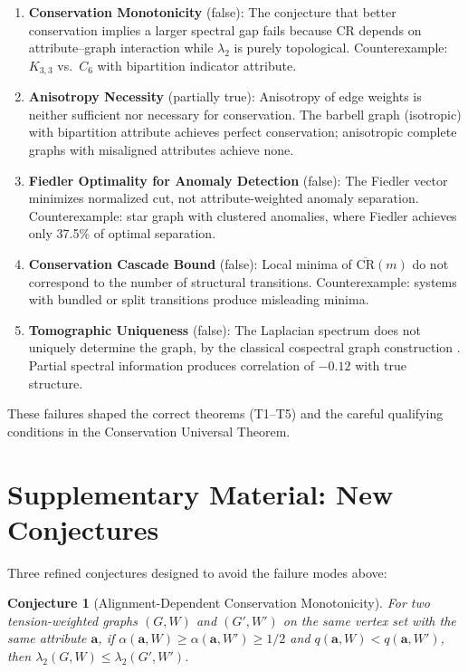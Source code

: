 \documentclass[12pt,letterpaper]{article}
\newtheorem{conjecture}[theorem]{Conjecture}
\newcommand{\bfa}{\mathbf{a}}
\newcommand{\CR}{\mathrm{CR}}
\begin{document}
\begin{enumerate}
  \item \textbf{Conservation Monotonicity} (false): The conjecture that better conservation implies a larger spectral gap fails because $\CR$ depends on attribute--graph interaction while $\lambda_2$ is purely topological. Counterexample: $K_{3,3}$ vs.\ $C_6$ with bipartition indicator attribute.

  \item \textbf{Anisotropy Necessity} (partially true): Anisotropy of edge weights is neither sufficient nor necessary for conservation. The barbell graph (isotropic) with bipartition attribute achieves perfect conservation; anisotropic complete graphs with misaligned attributes achieve none.

  \item \textbf{Fiedler Optimality for Anomaly Detection} (false): The Fiedler vector minimizes normalized cut, not attribute-weighted anomaly separation. Counterexample: star graph with clustered anomalies, where Fiedler achieves only 37.5\% of optimal separation.

  \item \textbf{Conservation Cascade Bound} (false): Local minima of $\overline{\CR}(m)$ do not correspond to the number of structural transitions. Counterexample: systems with bundled or split transitions produce misleading minima.

  \item \textbf{Tomographic Uniqueness} (false): The Laplacian spectrum does not uniquely determine the graph, by the classical cospectral graph construction \citep{collatz1957,vandam2003}. Partial spectral information produces correlation of $-0.12$ with true structure.
\end{enumerate}

These failures shaped the correct theorems (T1--T5) and the careful qualifying conditions in the Conservation Universal Theorem.

\section{Supplementary Material: New Conjectures}
\label{app:conjectures}

Three refined conjectures designed to avoid the failure modes above:

\begin{conjecture}[Alignment-Dependent Conservation Monotonicity]
For two tension-weighted graphs $(G, W)$ and $(G', W')$ on the same vertex set with the same attribute $\bfa$, if $\alpha(\bfa, W) \geq \alpha(\bfa, W') \geq 1/2$ and $q(\bfa, W) < q(\bfa, W')$, then $\lambda_2(G, W) \leq \lambda_2(G', W')$.
\end{conjecture}
\end{document}

